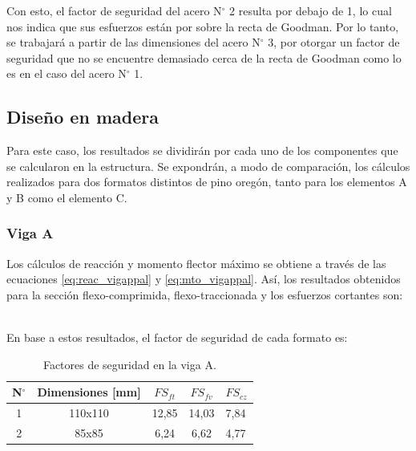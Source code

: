 Con esto, el factor de seguridad del acero N$^{\circ}$ 2 resulta por debajo de 1, lo cual nos indica que sus esfuerzos están por sobre la recta de Goodman. Por lo tanto, se trabajará a partir de las dimensiones del acero N$^{\circ}$ 3, por otorgar un factor de seguridad que no se encuentre demasiado cerca de la recta de Goodman como lo es en el caso del acero N$^{\circ}$ 1. 

\subsection{Diseño en madera}
Para este caso, los resultados se dividirán por cada uno de los componentes que se calcularon en la estructura. Se expondrán, a modo de comparación, los cálculos realizados para dos formatos distintos de pino oregón, tanto para los elementos A y B como el elemento C.

\subsubsection{Viga A} Los cálculos de reacción y momento flector máximo se obtiene a través de las ecuaciones \ref{eq:reac_vigappal} y \ref{eq:mto_vigappal}. Así, los resultados obtenidos para la sección flexo-comprimida, flexo-traccionada y los esfuerzos cortantes son:
\begin{table}[h]
\centering
{}
\caption{Resultados obtenidos para la flexión y cizalle de la viga A.}
\label{tab:res_viga_a1}
\end{table}
\\
En base a estos resultados, el factor de seguridad de cada formato es:

\begin{table}[H]
\centering
\begin{tabular}{@{}ccccl@{}}
\toprule
N$^{\circ}$ & Dimensiones [mm] & $FS_{ft}$ & $FS_{fv}$ & $FS_{cz}$ \\ \midrule
1 & 110x110 & 12,85 & 14,03 & 7,84 \\
2 & 85x85 & 6,24 & 6,62 & 4,77 \\ \bottomrule
\end{tabular}
\caption{Factores de seguridad en la viga A.}
\label{tab:res_viga_a2}
\end{table}

